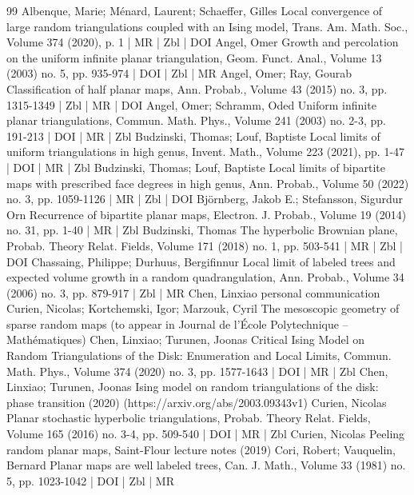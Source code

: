 \documentclass[10pt]{amsart}
\theoremstyle{definition}\newtheorem{defi}[theo]{Definition}\newtheorem{rema}[theo]{Remark}\newtheorem{exam}[theo]{Example}\newtheorem{exem}[theo]{Example}\newtheorem{nota}[theo]{Notation}
\begin{document}
\begin{thebibliography}{99}
Albenque, Marie; Ménard, Laurent; Schaeffer, Gilles Local convergence of large random triangulations coupled with an Ising model, Trans. Am. Math. Soc., Volume 374 (2020), p. 1 | MR | Zbl | DOI
Angel, Omer Growth and percolation on the uniform infinite planar triangulation, Geom. Funct. Anal., Volume 13 (2003) no. 5, pp. 935-974 | DOI | Zbl | MR
Angel, Omer; Ray, Gourab Classification of half planar maps, Ann. Probab., Volume 43 (2015) no. 3, pp. 1315-1349 | Zbl | MR | DOI
Angel, Omer; Schramm, Oded Uniform infinite planar triangulations, Commun. Math. Phys., Volume 241 (2003) no. 2-3, pp. 191-213 | DOI | MR | Zbl
Budzinski, Thomas; Louf, Baptiste Local limits of uniform triangulations in high genus, Invent. Math., Volume 223 (2021), pp. 1-47 | DOI | MR | Zbl
Budzinski, Thomas; Louf, Baptiste Local limits of bipartite maps with prescribed face degrees in high genus, Ann. Probab., Volume 50 (2022) no. 3, pp. 1059-1126 | MR | Zbl | DOI
Björnberg, Jakob E.; Stefansson, Sigurdur Orn Recurrence of bipartite planar maps, Electron. J. Probab., Volume 19 (2014) no. 31, pp. 1-40 | MR | Zbl
Budzinski, Thomas The hyperbolic Brownian plane, Probab. Theory Relat. Fields, Volume 171 (2018) no. 1, pp. 503-541 | MR | Zbl | DOI
Chassaing, Philippe; Durhuus, Bergifinnur Local limit of labeled trees and expected volume growth in a random quadrangulation, Ann. Probab., Volume 34 (2006) no. 3, pp. 879-917 | Zbl | MR
Chen, Linxiao personal communication
Curien, Nicolas; Kortchemski, Igor; Marzouk, Cyril The mesoscopic geometry of sparse random maps (to appear in Journal de l’École Polytechnique – Mathématiques)
Chen, Linxiao; Turunen, Joonas Critical Ising Model on Random Triangulations of the Disk: Enumeration and Local Limits, Commun. Math. Phys., Volume 374 (2020) no. 3, pp. 1577-1643 | DOI | MR | Zbl
Chen, Linxiao; Turunen, Joonas Ising model on random triangulations of the disk: phase transition (2020) (https://arxiv.org/abs/2003.09343v1)
Curien, Nicolas Planar stochastic hyperbolic triangulations, Probab. Theory Relat. Fields, Volume 165 (2016) no. 3-4, pp. 509-540 | DOI | MR | Zbl
Curien, Nicolas Peeling random planar maps, Saint-Flour lecture notes (2019)
Cori, Robert; Vauquelin, Bernard Planar maps are well labeled trees, Can. J. Math., Volume 33 (1981) no. 5, pp. 1023-1042 | DOI | Zbl | MR

\end{thebibliography}
\end{document}
